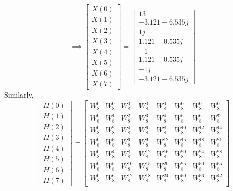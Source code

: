 \documentclass[journal,12pt,twocolumn]{IEEEtran}
\renewcommand\thesection{\arabic{section}}
\begin{document}
\begin{enumerate}[label=\thesection.\arabic*.,ref=\thesection.\theenumi]
\begin{equation}
\implies
\begin{bmatrix}
X(0) \\
X(1) \\
X(2) \\
X(3) \\
X(4) \\
X(5) \\
X(6) \\
X(7)
\end{bmatrix}
=
\begin{bmatrix}
13 \\
-3.121 - 6.535j \\
1j \\
1.121 - 0.535j \\
-1 \\
1.121 + 0.535j \\
-1j \\
-3.121 + 6.535j
\end{bmatrix}
\end{equation}
Similarly,
\begin{equation}
\begin{bmatrix}
H(0) \\
H(1) \\
H(2) \\
H(3) \\
H(4) \\
H(5) \\
H(6) \\
H(7)
\end{bmatrix}
=
\begin{bmatrix}
W^{0}_{8} & W^{0}_{8} & W^{0}_{8} & W^{0}_{8} & W^{0}_{8} & W^{0}_{8} & W^{0}_{8} & W^{0}_{8}\\
W^{0}_{8} & W^{1}_{8} & W^{2}_{8} & W^{3}_{8} & W^{4}_{8} & W^{5}_{8} & W^{6}_{8} & W^{7}_{8}\\
W^{0}_{8} & W^{2}_{8} & W^{4}_{8} & W^{6}_{8} & W^{8}_{8} & W^{10}_{8} & W^{12}_{8} & W^{14}_{8}\\
W^{0}_{8} & W^{3}_{8} & W^{6}_{8} & W^{9}_{8} & W^{12}_{8} & W^{15}_{8} & W^{18}_{8} & W^{21}_{8}\\
W^{0}_{8} & W^{4}_{8} & W^{8}_{8} & W^{12}_{8} & W^{16}_{8} & W^{20}_{8} & W^{24}_{8} & W^{28}_{8}\\
W^{0}_{8} & W^{5}_{8} & W^{10}_{8} & W^{15}_{8} & W^{20}_{8} & W^{25}_{8} & W^{30}_{8} & W^{35}_{8}\\
W^{0}_{8} & W^{6}_{8} & W^{12}_{8} & W^{18}_{8} & W^{24}_{8} & W^{30}_{8} & W^{36}_{8} & W^{42}_{8}\\

\end{bmatrix}
\end{equation}
\end{enumerate}
\end{document}
